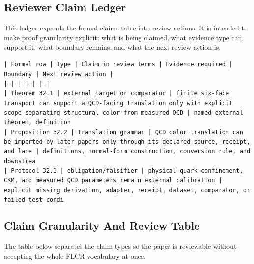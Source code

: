 \documentclass[11pt]{article}
\begin{document}
\subsection*{Reviewer Claim Ledger}

This ledger expands the formal-claims table into review actions. It is intended to make proof granularity explicit: what is being claimed, what evidence type can support it, what boundary remains, and what the next review action is.

\noindent\texttt{| Formal row | Type | Claim in review terms | Evidence required | Boundary | Next review action |}\\
\noindent\texttt{|---|---|---|---|---|---|}\\
\noindent\texttt{| Theorem 32.1 | external target or comparator | finite six-face transport can support a QCD-facing translation only with explicit scope separating structural color from measured QCD | named external theorem, definition }\\
\noindent\texttt{| Proposition 32.2 | translation grammar | QCD color translation can be imported by later papers only through its declared source, receipt, and lane | definitions, normal-form construction, conversion rule, and downstrea}\\
\noindent\texttt{| Protocol 32.3 | obligation/falsifier | physical quark confinement, CKM, and measured QCD parameters remain external calibration | explicit missing derivation, adapter, receipt, dataset, comparator, or failed test condi}\\

\subsection*{Claim Granularity And Review Table}

The table below separates the claim types so the paper is reviewable without accepting the whole FLCR vocabulary at once.
\end{document}
